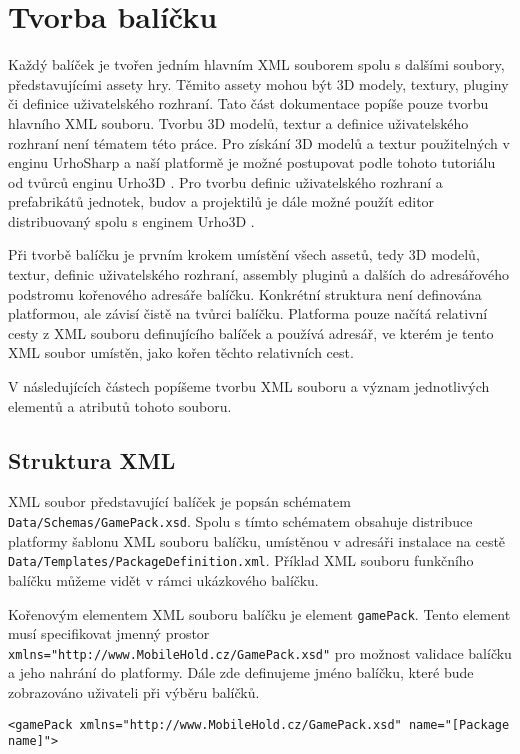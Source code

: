 \chapter{Tvorba balíčku}
\label{sec:packagemaking}
Každý balíček je tvořen jedním hlavním XML souborem spolu s dalšími soubory, představujícími assety hry. Těmito assety mohou být 3D modely, textury, pluginy či definice uživatelského rozhraní. Tato část dokumentace popíše pouze tvorbu hlavního XML souboru. Tvorbu 3D modelů, textur a definice uživatelského rozhraní není tématem této práce. Pro získání 3D modelů a textur použitelných v enginu UrhoSharp a naší platformě je možné postupovat podle tohoto tutoriálu od tvůrců enginu Urho3D \citep{site:blendertourho3D}. Pro tvorbu definic uživatelského rozhraní a prefabrikátů jednotek, budov a projektilů je dále možné použít editor distribuovaný spolu s enginem Urho3D \citep{site:urho3deditor}.

Při tvorbě balíčku je prvním krokem umístění všech assetů, tedy 3D modelů, textur, definic uživatelského rozhraní, assembly pluginů a dalších do adresářového podstromu kořenového adresáře balíčku. Konkrétní struktura není definována platformou, ale závisí čistě na tvůrci balíčku. Platforma pouze načítá relativní cesty z XML souboru definujícího balíček a používá adresář, ve kterém je tento XML soubor umístěn, jako kořen těchto relativních cest. 

V následujících částech popíšeme tvorbu XML souboru a význam jednotlivých elementů a atributů tohoto souboru.


\section{Struktura XML}
XML soubor představující balíček je popsán schématem \texttt{Data/Schemas/GamePack.xsd}. Spolu s tímto schématem obsahuje distribuce platformy šablonu XML souboru balíčku, umístěnou v adresáři instalace na cestě \texttt{Data/Templates/PackageDefinition.xml}. Příklad XML souboru funkčního balíčku můžeme vidět v rámci ukázkového balíčku. 

Kořenovým elementem XML souboru balíčku je element \texttt{gamePack}. Tento element musí specifikovat jmenný prostor \texttt{xmlns="http://www.MobileHold.cz/GamePack.xsd"} pro možnost validace balíčku a jeho nahrání do platformy. Dále zde  definujeme jméno balíčku, které bude zobrazováno uživateli při výběru balíčků. 

\lstset{
	language=XML
}
\begin{lstlisting}
<gamePack xmlns="http://www.MobileHold.cz/GamePack.xsd" name="[Package name]">
\end{lstlisting}


